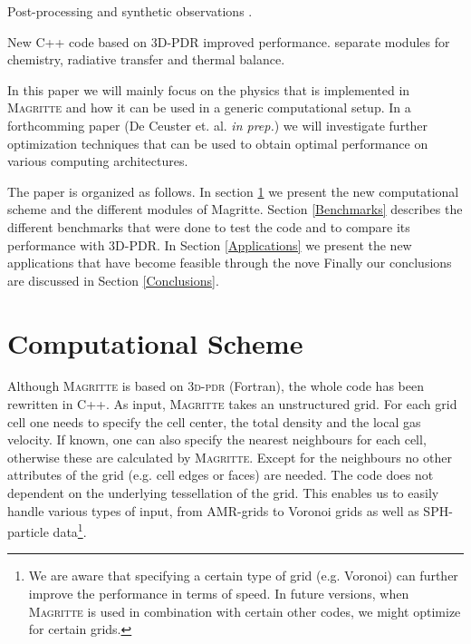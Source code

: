 \documentclass[a4paper,fleqn,usenatbib]{mnras}
\begin{document}
Post-processing and synthetic observations \citep{Haworth2017}.

New C++ code based on 3D-PDR \citep{Bisbas2012} improved performance. separate modules for chemistry, radiative transfer and thermal balance.

In this paper we will mainly focus on the physics that is implemented in \textsc{Magritte} and how it can be used in a generic computational setup. In a forthcomming paper (De Ceuster et. al. \textit{in prep.}) we will investigate further optimization techniques that can be used to obtain optimal performance on various computing architectures.

The paper is organized as follows. In section \ref{Computational} we present the new computational scheme and the different modules of Magritte. Section \ref{Benchmarks} describes the different benchmarks that were done to test the code and to compare its performance with 3D-PDR. In Section \ref{Applications} we present the new applications that have become feasible through the nove Finally our conclusions are discussed in Section \ref{Conclusions}.


\section{Computational Scheme}
\label{Computational}

Although \textsc{Magritte} is based on \textsc{3d-pdr} (Fortran), the whole code has been rewritten in C++. As input, \textsc{Magritte} takes an unstructured grid. For each grid cell one needs to specify the cell center, the total density and the local gas velocity. If known, one can also specify the nearest neighbours for each cell, otherwise these are calculated by \textsc{Magritte}. Except for the neighbours no other attributes of the grid (e.g. cell edges or faces) are needed. The code does not dependent on the underlying tessellation of the grid. This enables us to easily handle various types of input, from AMR-grids to Voronoi grids as well as SPH-particle data\footnote{We are aware that specifying a certain type of grid (e.g. Voronoi) can further improve the performance in terms of speed. In future versions, when \textsc{Magritte} is used in combination with certain other codes, we might optimize for certain grids.}.
\end{document}
